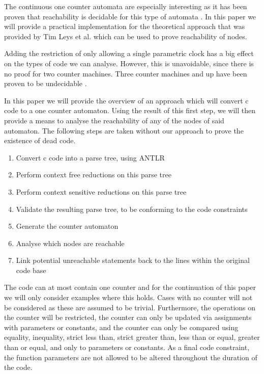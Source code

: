 \documentclass[12pt]{article}
\begin{document}
The continuous one counter automata are especially interesting as it has been proven that reachability is decidable for this type of automata \cite{succintandparametriconecounter, danialandjoel, blondin2021continuous}. In this paper we will provide a practical implementation for the theoretical approach that was provided by Tim Leys et al.\cite{blondin2021continuous} which can be used to prove reachability of nodes. 

Adding the restriction of only allowing a single parametric clock has a big effect on the types of code we can analyse. However, this is unavoidable, since there is no proof for two counter machines. Three counter machines and up have been proven to be undecidable \cite{FEARNLEY201526}.

In this paper we will provide the overview of an approach which will convert c code to a one counter automaton. Using the result of this first step, we will then provide a means to analyse the reachability of any of the nodes of said automaton. The following steps are taken without our approach to prove the existence of dead code.

\begin{enumerate}
	\item Convert c code into a parse tree, using ANTLR
	\item Perform context free reductions on this parse tree
	\item Perform context sensitive reductions on this parse tree
	\item Validate the resulting parse tree, to be conforming to the code constraints
	\item Generate the counter automaton
	\item Analyse which nodes are reachable
	\item Link potential unreachable statements back to the lines within the original code base
\end{enumerate}

The code can at most contain one counter and for the continuation of this paper we will only consider examples where this holds. Cases with no counter will not be considered as these are assumed to be trivial. Furthermore, the operations on the counter will be restricted, the counter can only be updated via assignments with parameters or constants, and the counter can only be compared using equality, inequality, strict less than, strict greater than, less than or equal, greater than or equal, and only to parameters or constants. As a final code constraint, the function parameters are not allowed to be altered throughout the duration of the code.
\end{document}
